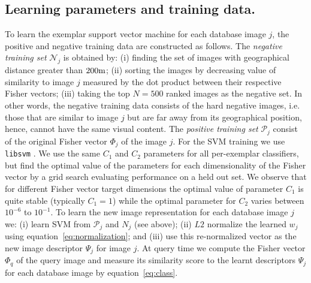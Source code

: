       \subsection{Learning parameters and training data.}
        To learn the exemplar support vector machine for each database image $j$, the positive and negative training data are constructed as follows. 
        The \emph{negative training set} $\mathcal N_j$ is obtained by: (i) finding the set of images with geographical distance greater than $200{\rm m}$; (ii)  sorting the images by decreasing value of similarity to image $j$ measured by the dot product between their respective Fisher vectors; (iii) taking the top $N=500$ ranked images as the negative set. 
        In other words, the negative training data consists of the hard negative images, i.e. those that are similar to image $j$ but are far away from its geographical position, hence, cannot have the same visual content. The \emph{positive training set} $\mathcal P_j$
         consist of the original Fisher vector $\Phi_j$ of the image $j$.
        For the SVM training we use {\tt libsvm} \cite{libsvm}. %
         We use the same $C_1$ and $C_2$ parameters for all per-exemplar classifiers, but find the optimal value of the parameters for each dimensionality of the Fisher vector by a grid search evaluating performance on a held out set.
         We observe that for different Fisher vector target dimensions the optimal value of parameter $C_1$ is quite stable (typically $C_1=1$) while the optimal parameter for $C_2$ varies between $10^{-6}$ to $10^{-1}$.
        To learn the new image representation for each database image $j$ we: (i) learn SVM from $\mathcal P_j$ and $N_j$ (see above); (ii) $L2$ normalize the learned $w_j$ using equation~\eqref{eq:normalization}; and (iii) use this re-normalized vector as the new image descriptor $\Psi_j$ for image $j$. At query time we compute the Fisher vector $\Phi_q$ of the query image and measure its similarity score to the learnt descriptors $\Psi_j$ for each database image by equation~\eqref{eq:class}.


